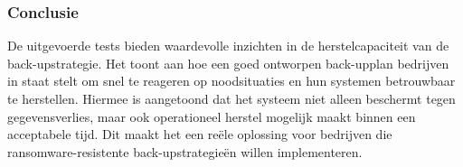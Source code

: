 
\subsubsection{Conclusie}
De uitgevoerde tests bieden waardevolle inzichten in de herstelcapaciteit van de back-upstrategie. Het toont aan hoe een goed ontworpen back-upplan bedrijven in staat stelt om snel te reageren op noodsituaties en hun systemen betrouwbaar te herstellen. Hiermee is aangetoond dat het systeem niet alleen beschermt tegen gegevensverlies, maar ook operationeel herstel mogelijk maakt binnen een acceptabele tijd. Dit maakt het een reële oplossing voor bedrijven die ransomware-resistente back-upstrategieën willen implementeren.































